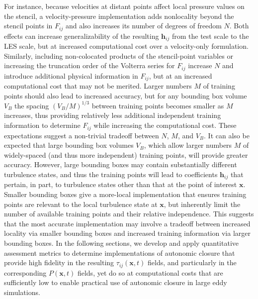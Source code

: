 For instance, because velocities at distant points affect local pressure values on the stencil, a velocity-pressure implementation adds nonlocality beyond the stencil points in  $F_{ij}$ and also increases its number of degrees of freedom $N$. Both effects can increase generalizability of the resulting $\mathbf{h}_{ij}$  from the test scale to the LES scale, but at increased computational cost over a velocity-only formulation. Similarly, including non-colocated products of the stencil-point variables or increasing the truncation order of the Volterra series for $F_{ij}$  increase $N$ and introduce additional physical information in $F_{ij}$, but at an increased computational cost that may not be merited. Larger numbers $M$ of training points should also lead to increased accuracy, but for any bounding box volume $V_B$  the spacing $(V_B/M)^{1/3}$  between training points becomes smaller as $M$ increases, thus providing relatively less additional independent training information to determine $F_{ij}$  while increasing the computational cost. These expectations suggest a non-trivial tradeoff between $N$, $M$, and  $V_B$.  
It can also be expected that large bounding box volumes $V_B$, which allow larger numbers $M$ of widely-spaced (and thus more independent) training points, will provide greater accuracy. However, large bounding boxes may contain substantially different turbulence states, and thus the training points will lead to coefficients  $\mathbf{h}_{ij}$ that pertain, in part, to turbulence states other than that at the point of interest $\mathbf{x}$. Smaller bounding boxes give a more-local implementation that ensures training points are relevant to the local turbulence state at $\mathbf{x}$, but inherently limit the number of available training points and their relative independence. This suggests that the most accurate implementation may involve a tradeoff between increased locality via smaller bounding boxes and increased training information via larger bounding boxes. 
In the following sections, we develop and apply quantitative assessment metrics to determine implementations of autonomic closure that provide high fidelity in the resulting  $\tau_{ij}(\mathbf{x},t)$   fields, and particularly in the corresponding $P(\mathbf{x},t)$   fields, yet do so at computational costs that are sufficiently low to enable practical use of autonomic closure in large eddy simulations. 

